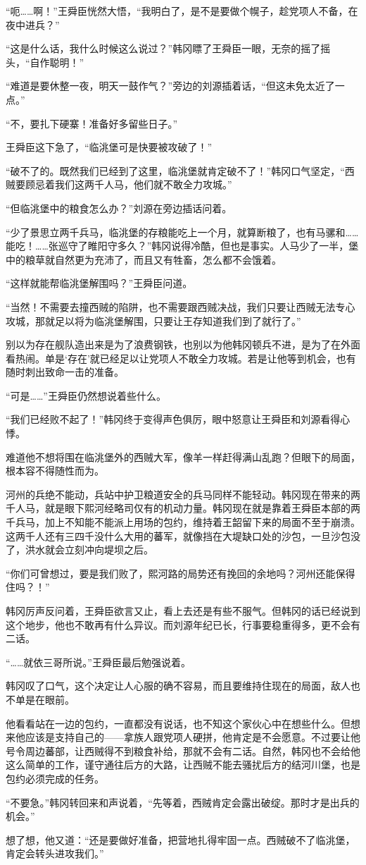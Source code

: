 “呃……啊！”王舜臣恍然大悟，“我明白了，是不是要做个幌子，趁党项人不备，在夜中进兵？”

“这是什么话，我什么时候这么说过？”韩冈瞟了王舜臣一眼，无奈的摇了摇头，“自作聪明！”

“难道是要休整一夜，明天一鼓作气？”旁边的刘源插着话，“但这未免太近了一点。”

“不，要扎下硬寨！准备好多留些日子。”

王舜臣这下急了，“临洮堡可是快要被攻破了！”

“破不了的。既然我们已经到了这里，临洮堡就肯定破不了！”韩冈口气坚定，“西贼要顾忌着我们这两千人马，他们就不敢全力攻城。”

“但临洮堡中的粮食怎么办？”刘源在旁边插话问着。

“少了景思立两千兵马，临洮堡的存粮能吃上一个月，就算断粮了，也有马骡和……能吃！……张巡守了睢阳守多久？”韩冈说得冷酷，但也是事实。人马少了一半，堡中的粮草就自然更为充沛了，而且又有牲畜，怎么都不会饿着。

“这样就能帮临洮堡解围吗？”王舜臣问道。

“当然！不需要去撞西贼的陷阱，也不需要跟西贼决战，我们只要让西贼无法专心攻城，那就足以将为临洮堡解围，只要让王存知道我们到了就行了。”

别以为存在舰队造出来是为了浪费钢铁，也别以为他韩冈顿兵不进，是为了在外面看热闹。单是‘存在’就已经足以让党项人不敢全力攻城。若是让他等到机会，也有随时刺出致命一击的准备。

“可是……”王舜臣仍然想说着些什么。

“我们已经败不起了！”韩冈终于变得声色俱厉，眼中怒意让王舜臣和刘源看得心悸。

难道他不想将围在临洮堡外的西贼大军，像羊一样赶得满山乱跑？但眼下的局面，根本容不得随性而为。

河州的兵绝不能动，兵站中护卫粮道安全的兵马同样不能轻动。韩冈现在带来的两千人马，就是眼下熙河经略司仅有的机动力量。韩冈现在就是靠着王舜臣本部的两千兵马，加上不知能不能派上用场的包约，维持着王韶留下来的局面不至于崩溃。这两千人还有三四千没什么大用的蕃军，就像挡在大堤缺口处的沙包，一旦沙包没了，洪水就会立刻冲向堤坝之后。

“你们可曾想过，要是我们败了，熙河路的局势还有挽回的余地吗？河州还能保得住吗？！”

韩冈厉声反问着，王舜臣欲言又止，看上去还是有些不服气。但韩冈的话已经说到这个地步，他也不敢再有什么异议。而刘源年纪已长，行事要稳重得多，更不会有二话。

“……就依三哥所说。”王舜臣最后勉强说着。

韩冈叹了口气，这个决定让人心服的确不容易，而且要维持住现在的局面，敌人也不单是在眼前。

他看看站在一边的包约，一直都没有说话，也不知这个家伙心中在想些什么。但想来他应该是支持自己的——拿族人跟党项人硬拼，他肯定是不会愿意。不过要让他号令周边蕃部，让西贼得不到粮食补给，那就不会有二话。自然，韩冈也不会给他这么简单的工作，谨守通往后方的大路，让西贼不能去骚扰后方的结河川堡，也是包约必须完成的任务。

“不要急。”韩冈转回来和声说着，“先等着，西贼肯定会露出破绽。那时才是出兵的机会。”

想了想，他又道：“还是要做好准备，把营地扎得牢固一点。西贼破不了临洮堡，肯定会转头进攻我们。”

